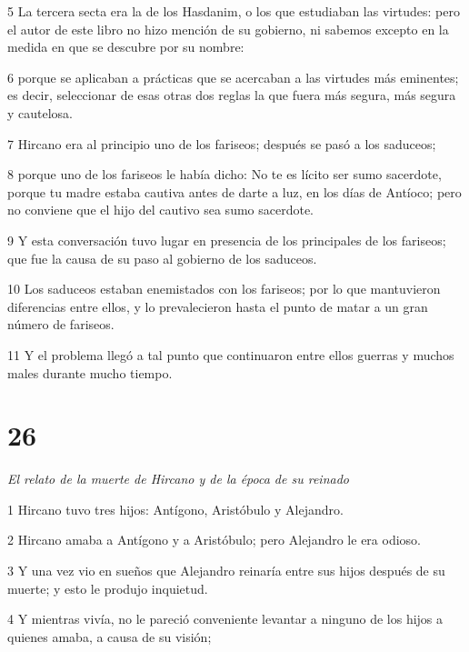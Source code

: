\par 5 La tercera secta era la de los Hasdanim, o los que estudiaban las virtudes: pero el autor de este libro no hizo mención de su gobierno, ni sabemos excepto en la medida en que se descubre por su nombre:

\par 6 porque se aplicaban a prácticas que se acercaban a las virtudes más eminentes; es decir, seleccionar de esas otras dos reglas la que fuera más segura, más segura y cautelosa.

\par 7 Hircano era al principio uno de los fariseos; después se pasó a los saduceos;

\par 8 porque uno de los fariseos le había dicho: No te es lícito ser sumo sacerdote, porque tu madre estaba cautiva antes de darte a luz, en los días de Antíoco; pero no conviene que el hijo del cautivo sea sumo sacerdote.

\par 9 Y esta conversación tuvo lugar en presencia de los principales de los fariseos; que fue la causa de su paso al gobierno de los saduceos.

\par 10 Los saduceos estaban enemistados con los fariseos; por lo que mantuvieron diferencias entre ellos, y lo prevalecieron hasta el punto de matar a un gran número de fariseos.

\par 11 Y el problema llegó a tal punto que continuaron entre ellos guerras y muchos males durante mucho tiempo.

\chapter{26}

\par \textit{El relato de la muerte de Hircano y de la época de su reinado}

\par 1 Hircano tuvo tres hijos: Antígono, Aristóbulo y Alejandro.

\par 2 Hircano amaba a Antígono y a Aristóbulo; pero Alejandro le era odioso.

\par 3 Y una vez vio en sueños que Alejandro reinaría entre sus hijos después de su muerte; y esto le produjo inquietud.

\par 4 Y mientras vivía, no le pareció conveniente levantar a ninguno de los hijos a quienes amaba, a causa de su visión;

